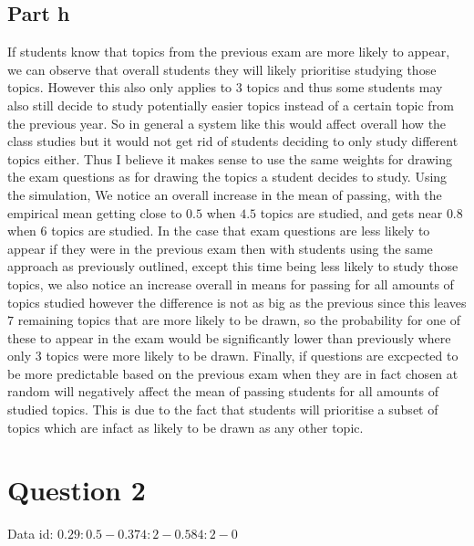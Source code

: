 \documentclass[10pt]{article}
\begin{document}
\subsection*{Part h}
If students know that topics from the previous exam are more likely to appear, we can observe that overall students
they will likely prioritise studying those topics. However this also only applies to 3 topics and thus
some students may also still decide to study potentially easier topics instead of a certain topic 
from the previous year. So in general a system like this would affect overall how the class studies but
it would not get rid of students deciding to only study different topics either. Thus I believe it makes sense to 
use the same weights for drawing the exam questions as for drawing the topics a student decides to study.
Using the simulation, We notice an overall increase in the mean of passing, with the empirical mean getting close to 
$0.5$ when $4.5$ topics are studied, and gets near $0.8$ when $6$ topics are studied. In the case that exam  
questions are less likely to appear if they were in the previous exam then with students using the same approach as 
previously outlined, except this time being less likely to study those topics, we also notice
an increase overall in means for passing for all amounts of topics studied however the difference is not as big as the previous
since this leaves $7$ remaining topics that are more likely to be drawn, so the probability for one of these to appear in the
exam would be significantly lower than previously where only 3 topics were more likely to be drawn.
Finally, if questions are excpected to be more predictable based on the previous exam when they are in fact 
chosen at random will negatively affect the mean of passing students for all amounts of studied topics. This is 
due to the fact that students will prioritise a subset of topics which are infact as likely to be drawn as 
any other topic.


\section*{Question 2}
Data id: $0.29:0.5-0.374:2-0.584:2-0$
\end{document}
